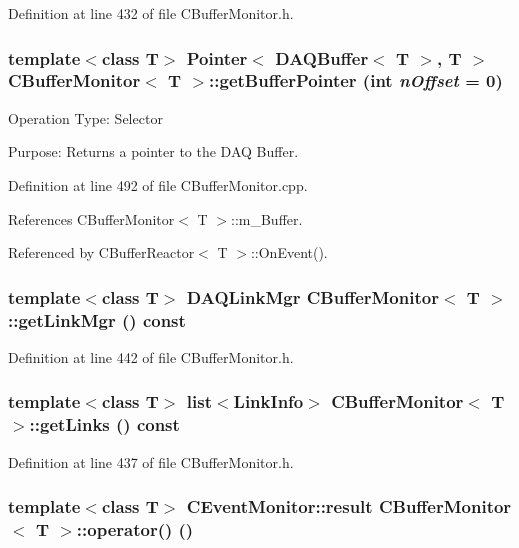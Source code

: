 Definition at line 432 of file CBuffer\-Monitor.h.
\subsubsection{\setlength{\rightskip}{0pt plus 5cm}template$<$class T$>$ Pointer$<$ DAQBuffer$<$ T $>$, T $>$ CBuffer\-Monitor$<$ T $>$::get\-Buffer\-Pointer (int {\em n\-Offset} = 0)}\label{classCBufferMonitor_a14}


Operation Type: Selector

Purpose: Returns a pointer to the DAQ Buffer. 

Definition at line 492 of file CBuffer\-Monitor.cpp.

References CBuffer\-Monitor$<$ T $>$::m\_\-Buffer.

Referenced by CBuffer\-Reactor$<$ T $>$::On\-Event().
\subsubsection{\setlength{\rightskip}{0pt plus 5cm}template$<$class T$>$ DAQLink\-Mgr CBuffer\-Monitor$<$ T $>$::get\-Link\-Mgr () const\hspace{0.3cm}{\tt  [inline]}}\label{classCBufferMonitor_a6}




Definition at line 442 of file CBuffer\-Monitor.h.
\subsubsection{\setlength{\rightskip}{0pt plus 5cm}template$<$class T$>$ list$<${\bf Link\-Info}$>$ CBuffer\-Monitor$<$ T $>$::get\-Links () const\hspace{0.3cm}{\tt  [inline]}}\label{classCBufferMonitor_a5}




Definition at line 437 of file CBuffer\-Monitor.h.
\subsubsection{\setlength{\rightskip}{0pt plus 5cm}template$<$class T$>$ {\bf CEvent\-Monitor::result} CBuffer\-Monitor$<$ T $>$::operator() ()\hspace{0.3cm}{\tt  [virtual]}}\label{classCBufferMonitor_a7}


